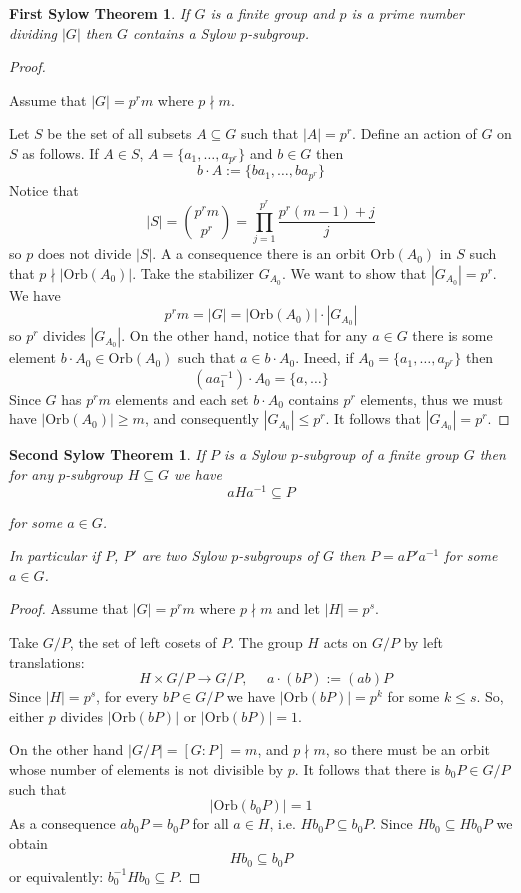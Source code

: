 \documentclass[12pt, letterpaper, oneside]{article}
\theoremstyle{plain}
\newtheorem{FST}[theorem]{First Sylow Theorem}
\newtheorem{SST}[theorem]{Second Sylow Theorem}
\theoremstyle{definition}
\newcommand{\Orb}{\mathrm{Orb}}
\newcommand{\vs}{\vskip 5mm}
\begin{document}
\begin{FST}
\label{THM_FST}
If $G$ is a finite group  and $p$ is a prime number dividing $|G|$ then 
$G$ contains a Sylow $p$-subgroup.
\end{FST}

\begin{proof}\ 

Assume that $|G| = p^{r}m$ where $p\nmid m$. 

Let $S$ be the set of all subsets $A\subseteq G$ such that $|A|=p^{r}$.
Define an action of $G$ on $S$ as follows. 
If $A \in S$, $A= \{a_{1}, \dots, a_{p^{r}}\}$ and  $b\in G$ then
$$b\cdot A := \{ ba_{1}, \dots, ba_{p^{r}}\}$$
Notice that 
$$|S| = \binom{p^{r}m}{p^{r}} = \prod_{j=1}^{p^{r}}\frac{p^{r}(m-1)+j}{j}$$
so $p$ does not divide $|S|$. A a consequence there is an orbit $\Orb(A_{0})$ 
in $S$ such that $p\nmid |\Orb(A_{0})|$. Take the stabilizer $G_{A_{0}}$. 
We want to show that $|G_{A_{0}}| = p^{r}$.
We have 
$$p^{r}m = |G| = |\Orb(A_{0})|\cdot |G_{A_{0}}|$$
so $p^{r}$ divides $|G_{A_{0}}|$. On the other hand, notice that for any $a\in G$ 
there is some element  $b\cdot A_{0} \in \Orb(A_{0})$ such that $a\in b\cdot A_{0}$.
Ineed, if $A_{0}= \{a_{1}, \dots, a_{p^{r}}\}$ then 
$$(aa_{1}^{-1})\cdot A_{0} = \{a, \dots \}$$
Since $G$ has $p^{r}m$ elements and each set $b\cdot A_{0}$ contains $p^{r}$ elements, 
thus we must have $|\Orb(A_{0})| \geq m$, and consequently $|G_{A_{0}}| \leq p^{r}$. 
It follows that $|G_{A_{0}}|= p^{r}$.
\end{proof}


\vs\vs

\begin{SST}
\label{THM_SST}
If $P$ is a Sylow $p$-subgroup of a finite group $G$ then for any  $p$-subgroup $H\subseteq G$ 
we have  
$$aHa^{-1}\subseteq P$$ 

\vskip -7mm

for some $a\in G$. 

In particular if $P$, $P'$ are two Sylow $p$-subgroups of $G$ then $P = aP'a^{-1}$
for some $a\in G$.
 
\end{SST}

\vs\vs

\begin{proof}
Assume that  $|G|=p^{r}m$ where $p\nmid m$ and let $|H| = p^{s}$.
 
Take $G/P$, the set  of left cosets of $P$. The group $H$ acts on $G/P$ by left translations:
$$\ \ \ H \times G/P \to G/P, \ \ \ \ \ \ a\cdot (bP) := (ab)P$$
Since $|H| = p^{s}$, for every $bP\in G/P$ we have $|\Orb(bP)| = p^{k}$
for some $k \leq s$. So, either $p$ divides $|\Orb(bP)|$ or $|\Orb(bP)|=1$.

On the other hand $|G/P| = [G:P] = m$, and $p\nmid m$, so there must be an orbit whose 
number of elements is not divisible by $p$. It follows that there is $b_{0}P \in G/P$ such that 
$$|\Orb(b_{0}P)|=1$$
As a consequence $ab_{0}P = b_{0}P$ for all $a\in H$, i.e. $Hb_{0}P\subseteq b_{0}P$.  
Since $Hb_{0}\subseteq Hb_{0}P$ we obtain
$$Hb_{0}\subseteq b_{0}P$$
or equivalently: $b_{0}^{-1}Hb_{0} \subseteq P$.
\end{proof}
\end{document}
